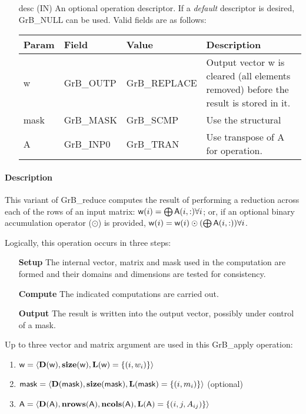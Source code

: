 \begin{itemize}[leftmargin=1.1in]
    \item[{\sf desc}]  ({\sf IN}) An optional operation descriptor.  If a \emph{default}
    descriptor is desired, {\sf GrB\_NULL} can be used.  Valid fields are
    as follows: \\
    
    \begin{tabular}{lllp{2.5in}}
        Param & Field  & Value & Description \\
        \hline
        {\sf w}    & {\sf GrB\_OUTP} & {\sf GrB\_REPLACE} & Output vector {\sf w}
        is cleared (all elements removed) before the result is stored in it. \\
        
        {\sf mask} & {\sf GrB\_MASK} & {\sf GrB\_SCMP}   & Use the structural \\
        {\sf A}    & {\sf GrB\_INP0} & {\sf GrB\_TRAN}   & Use transpose of {\sf A} for operation. 
    \end{tabular}
\end{itemize}

\paragraph{Description}

This variant of {\sf GrB\_reduce} computes the result of performing
a reduction across each of the rows of an input matrix:
${\sf w}(i) = \bigoplus {\sf A}(i,:) \forall i$; 
or, if an optional binary accumulation 
operator ($\odot$) is provided, ${\sf w}(i) = {\sf w}(i) \odot (\bigoplus {\sf A}(i,:)) \forall i$.  

Logically, this operation occurs in three steps:
\begin{enumerate}[leftmargin=0.75in]
\item[\bf Setup] The internal vector, matrix and mask used in the computation are formed 
and their domains and dimensions are tested for consistency.
\item[\bf Compute] The indicated computations are carried out.
\item[\bf Output] The result is written into the output vector, possibly under 
control of a mask.
\end{enumerate}

Up to three vector and matrix argument are used in this {\sf GrB\_apply} operation:
\begin{enumerate}
	\item ${\sf w} = \langle \bold{D}({\sf w}),\bold{size}({\sf w}),
    \bold{L}({\sf w}) = \{(i,w_i) \} \rangle$

	\item ${\sf mask} = \langle \bold{D}({\sf mask}),\bold{size}({\sf mask}),
    \bold{L}({\sf mask}) = \{(i,m_i) \} \rangle$ (optional)

	\item ${\sf A} = \langle \bold{D}({\sf A}),\bold{nrows}({\sf A}),
    \bold{ncols}({\sf A}),\bold{L}({\sf A}) = \{(i,j,A_{ij}) \} \rangle$
\end{enumerate}


